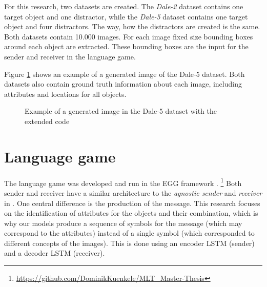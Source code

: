 \documentclass[11pt]{article}
\begin{document}
For this research, two datasets are created.
The \emph{Dale-2} dataset contains one target object and one distractor, while the \emph{Dale-5} dataset contains one target object and four distractors.
The way, how the distractors are created is the same.
Both datasets contain 10.000 images.
For each image fixed size bounding boxes around each object are extracted.
These bounding boxes are the input for the sender and receiver in the language game.

Figure \ref{fig:clevr-extended_example} shows an example of a generated image of the Dale-5 dataset.
Both datasets also contain ground truth information about each image, including attributes and locations for all objects.

\begin{figure}[h]
  \centering
  \caption{Example of a generated image in the Dale-5 dataset with the extended code}
  \label{fig:clevr-extended_example}
\end{figure}


\section{Language game}
The language game was developed and run in the EGG framework \citep{Kharitonov2019}. \footnote{\href{https://github.com/DominikKuenkele/MLT\_Master-Thesis}{https://github.com/DominikKuenkele/MLT\_Master-Thesis}}
Both sender and receiver have a similar architecture to the \emph{agnostic sender} and \emph{receiver} in \citet{Lazaridou2016}.
One central difference is the production of the message.
This research focuses on the identification of attributes for the objects and their combination, which is why our models produce a sequence of symbols for the message (which may correspond to the attributes) instead of a single symbol (which corresponded to different concepts of the images).
This is done using an encoder LSTM (sender) and a decoder LSTM (receiver).
\end{document}
